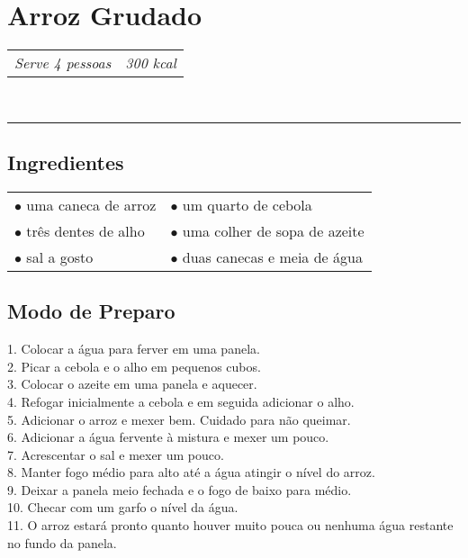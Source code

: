 \newpage
\noindent
\vspace*{-2.0cm}
\section*{\sectionformat Arroz Grudado}
\vspace*{-0.1cm}
\begin{aemulticol}[width=0.495\textwidth,height=0.545\textheight]
	\begin{tabu} to 0.5\linewidth {X[l]X[r]}
	   \textit{Serve 4 pessoas} & \textit{300 kcal}
	\end{tabu}\\
	\rule[0.5ex]{0.5\linewidth}{1pt}	
	\vspace*{-0.3cm}
	\subsection*{\subsectionformat Ingredientes}
	\vspace*{-0.15cm}
	\begin{tabu} to 0.5\linewidth {X[l]X[l]}
	   $\bullet$ uma caneca de arroz & $\bullet$ um quarto de cebola\\$\bullet$ três dentes de alho & $\bullet$ uma colher de sopa de azeite\\$\bullet$ sal a gosto & $\bullet$ duas canecas e meia de água

	\end{tabu}
	\vspace*{-0.15cm}
	\subsection*{\subsectionformat Modo de Preparo}
	\vspace*{-0.15cm}
	1. Colocar a água para ferver em uma panela.\\
2. Picar a cebola e o alho em pequenos cubos.\\
3. Colocar o azeite em uma panela e aquecer.\\
4. Refogar inicialmente a cebola e em seguida adicionar o alho.\\
5. Adicionar o arroz e mexer bem. Cuidado para não queimar.\\
6. Adicionar a água fervente à mistura e mexer um pouco.\\
7. Acrescentar o sal e mexer um pouco.\\
8. Manter fogo médio para alto até a água atingir o nível do arroz.\\
9. Deixar a panela meio fechada e o fogo de baixo para médio.\\
10. Checar com um garfo o nível da água.\\
11. O arroz estará pronto quanto houver muito pouca ou nenhuma água restante no fundo da panela.


\end{aemulticol}
